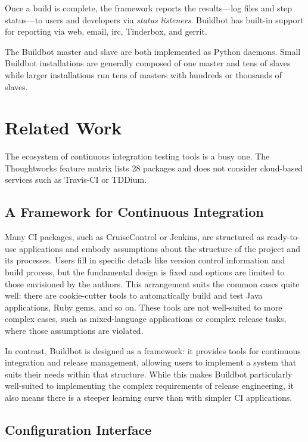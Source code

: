 \documentclass[conference]{IEEEtran}
\begin{document}
Once a build is complete, the framework reports the results---log files and step status---to users and developers via \emph{status listeners}.
Buildbot has built-in support for reporting via web, email, irc, Tinderbox, and gerrit.

The Buildbot master and slave are both implemented as Python daemons.
Small Buildbot installations are generally composed of one master and tens of slaves while larger installations run tens of masters with hundreds or thousands of slaves.

\section{Related Work}

The ecosystem of continuous integration testing tools is a busy one.
The Thoughtworks feature matrix\cite{ci-feature-matrix} lists 28 packages and does not consider cloud-based services such as Travis-CI or TDDium.

\subsection{A Framework for Continuous Integration}

Many CI packages, such as CruiseControl\cite{cruisecontrol-getting-started} or Jenkins\cite{meet-jenkins}, are structured as ready-to-use applications and embody assumptions about the structure of the project and its processes.
Users fill in specific details like version control information and build process, but the fundamental design is fixed and options are limited to those envisioned by the authors.
This arrangement suits the common cases quite well: there are cookie-cutter tools to automatically build and test Java applications, Ruby gems, and so on.
These tools are not well-suited to more complex cases, such as mixed-language applications or complex release tasks, where those assumptions are violated.

In contrast, Buildbot is designed as a framework: it provides tools for continuous integration and release management, allowing users to implement a system that suits their needs within that structure.
While this makes Buildbot particularly well-suited to implementing the complex requirements of release engineering, it also means there is a steeper learning curve than with simpler CI applications.

\subsection{Configuration Interface}
\end{document}
